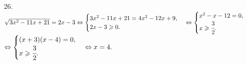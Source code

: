 26. $\sqrt{3x^2-11x+21}=2x-3\Leftrightarrow\begin{cases} 3x^2-11x+21=4x^2-12x+9,\\ 2x-3\geqslant0.\end{cases}
\Leftrightarrow\begin{cases} x^2-x-12=0,\\ x\geqslant\cfrac{3}{2}.\end{cases}$\\$
\Leftrightarrow\begin{cases} (x+3)(x-4)=0,\\ x\geqslant\cfrac{3}{2}.\end{cases}
\Leftrightarrow x=4.$\\
